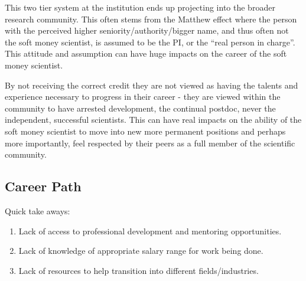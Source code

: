 \documentclass[letterpaper, 12pt]{article}
\begin{document}
This two tier system at the institution ends up projecting into the broader research community. This often stems from the Matthew effect where the person with the perceived higher seniority/authority/bigger name, and thus often not the soft money scientist, is assumed to be the PI, or the “real person in charge”. This attitude and assumption can have huge impacts on the career of the soft money scientist. 

By not receiving the correct credit they are not viewed as having the talents and experience necessary to progress in their career - they are viewed within the community to have arrested development, the continual postdoc, never the independent, successful scientists.  This can have real impacts on the ability of the soft money scientist to move into new more permanent positions and perhaps more importantly, feel respected by their peers as a full member of the scientific community. 

\subsection{Career Path}
       
\begin{tcolorbox}[enhanced,width=\textwidth,center upper,
    fontupper=\bfseries,sharp corners, colback=CASIIlightgrey, colframe=CASIIdarkgreen]
\textcolor{CASIIorange}{Quick take aways:}
\begin{enumerate}

    \item \textcolor{CASIIdarkindago}{Lack of access to professional development and mentoring opportunities.}
    \item \textcolor{CASIIdarkindago}{Lack of knowledge of appropriate salary range for work being done.}
    \item \textcolor{CASIIdarkindago}{Lack of resources to help transition into different fields/industries.}

\end{enumerate}
\end{tcolorbox}
\end{document}
